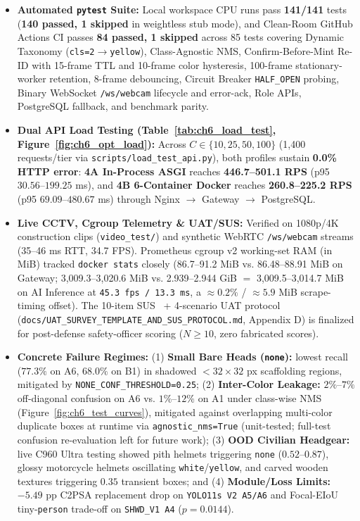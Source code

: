 \begin{itemize}[leftmargin=1.8em, itemsep=2.5pt]
  \item \textbf{Automated \texttt{pytest} Suite:} Local workspace CPU runs pass \textbf{141/141} tests (\textbf{140 passed, 1 skipped} in weightless stub mode), and Clean-Room GitHub Actions CI passes \textbf{84 passed, 1 skipped} across 85 tests covering Dynamic Taxonomy (\texttt{cls=2}$\to$\texttt{yellow}), Class-Agnostic NMS, Confirm-Before-Mint Re-ID with 15-frame TTL and 10-frame color hysteresis, 100-frame stationary-worker retention, 8-frame debouncing, Circuit Breaker \texttt{HALF\_OPEN} probing, Binary WebSocket \texttt{/ws/webcam} lifecycle and error-ack, Role APIs, PostgreSQL fallback, and benchmark parity.
  \item \textbf{Dual API Load Testing (Table~\ref{tab:ch6_load_test}, Figure~\ref{fig:ch6_opt_load}):} Across $C \in \{10, 25, 50, 100\}$ (1,400 requests/tier via \nolinkurl{scripts/load_test_api.py}), both profiles sustain \textbf{0.0\% HTTP error}: \textbf{4A In-Process ASGI} reaches \textbf{446.7--501.1 RPS} (p95 $30.56$--$199.25$ ms), and \textbf{4B 6-Container Docker} reaches \textbf{260.8--225.2 RPS} (p95 $69.09$--$480.67$ ms) through Nginx $\to$ Gateway $\to$ PostgreSQL.
  \item \textbf{Live CCTV, Cgroup Telemetry \& UAT/SUS:} Verified on 1080p/4K construction clips (\texttt{video\_test/}) and synthetic WebRTC \texttt{/ws/webcam} streams (35--46 ms RTT, 34.7 FPS). Prometheus cgroup v2 working-set RAM (in MiB) tracked \texttt{docker stats} closely (86.7--91.2 MiB vs. 86.48--88.91 MiB on Gateway; 3,009.3--3,020.6 MiB vs. 2.939--2.944 GiB $=$ 3,009.5--3,014.7 MiB on AI Inference at \texttt{45.3 fps / 13.3 ms}, a $\approx 0.2\%$ / $\approx 5.9$ MiB scrape-timing offset). The 10-item SUS~\cite{brooke1996sus} + 4-scenario UAT protocol (\nolinkurl{docs/UAT_SURVEY_TEMPLATE_AND_SUS_PROTOCOL.md}, Appendix D) is finalized for post-defense safety-officer scoring ($N \ge 10$, zero fabricated scores).
  \item \textbf{Concrete Failure Regimes:} (1) \textbf{Small Bare Heads (\texttt{none}):} lowest recall ($77.3\%$ on A6, $68.0\%$ on B1) in shadowed $<32\times 32$ px scaffolding regions, mitigated by \nolinkurl{NONE_CONF_THRESHOLD=0.25}; (2) \textbf{Inter-Color Leakage:} $2\%\text{--}7\%$ off-diagonal confusion on A6 vs. $1\%\text{--}12\%$ on A1 under class-wise NMS (Figure~\ref{fig:ch6_test_curves}), mitigated against overlapping multi-color duplicate boxes at runtime via \texttt{agnostic\_nms=True} (unit-tested; full-test confusion re-evaluation left for future work); (3) \textbf{OOD Civilian Headgear:} live C960 Ultra testing showed pith helmets triggering \texttt{none} ($0.52\text{--}0.87$), glossy motorcycle helmets oscillating \texttt{white}/\texttt{yellow}, and carved wooden textures triggering $0.35$ transient boxes; and (4) \textbf{Module/Loss Limits:} $-5.49$ pp C2PSA replacement drop on \texttt{YOLO11s V2 A5/A6} and Focal-EIoU tiny-\texttt{person} trade-off on \texttt{SHWD\_V1 A4} ($p=0.0144$).
\end{itemize}


